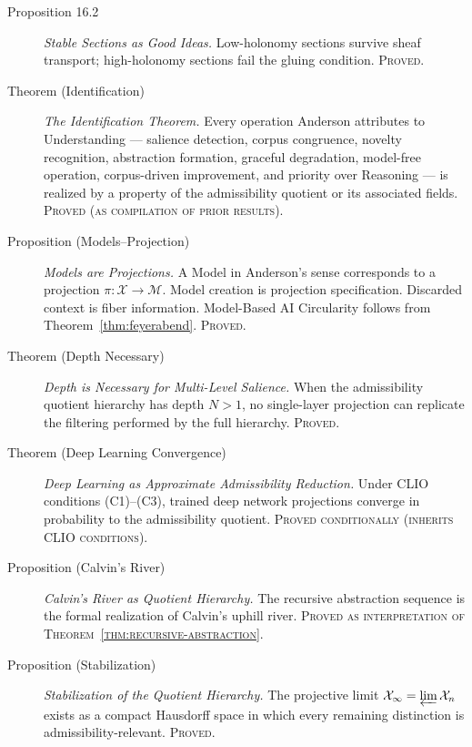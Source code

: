 \documentclass[12pt, a4paper, oneside]{book}
\newcommand{\X}{\mathcal{X}}
\newcommand{\M}{\mathcal{M}}
\newcommand{\proj}{\pi}
\begin{document}
\begin{description}
\item[Proposition 16.2] \textit{Stable Sections as Good Ideas.}
  Low-holonomy sections survive sheaf transport; high-holonomy sections
  fail the gluing condition. \textsc{Proved.}

\item[Theorem (Identification)] \textit{The Identification Theorem.}
  Every operation Anderson attributes to Understanding --- salience
  detection, corpus congruence, novelty recognition, abstraction
  formation, graceful degradation, model-free operation, corpus-driven
  improvement, and priority over Reasoning --- is realized by a property
  of the admissibility quotient or its associated fields.
  \textsc{Proved (as compilation of prior results).}

\item[Proposition (Models--Projection)] \textit{Models are Projections.}
  A Model in Anderson's sense corresponds to a projection $\proj : \X \to \M$.
  Model creation is projection specification. Discarded context is fiber
  information. Model-Based AI Circularity follows from
  Theorem~\ref{thm:feyerabend}. \textsc{Proved.}

\item[Theorem (Depth Necessary)] \textit{Depth is Necessary for Multi-Level Salience.}
  When the admissibility quotient hierarchy has depth $N > 1$, no
  single-layer projection can replicate the filtering performed by the
  full hierarchy. \textsc{Proved.}

\item[Theorem (Deep Learning Convergence)] \textit{Deep Learning as
  Approximate Admissibility Reduction.}
  Under CLIO conditions (C1)--(C3), trained deep network projections
  converge in probability to the admissibility quotient.
  \textsc{Proved conditionally (inherits CLIO conditions).}

\item[Proposition (Calvin's River)] \textit{Calvin's River as Quotient Hierarchy.}
  The recursive abstraction sequence is the formal realization of
  Calvin's uphill river. \textsc{Proved as interpretation of
  Theorem~\ref{thm:recursive-abstraction}.}

\item[Proposition (Stabilization)] \textit{Stabilization of the Quotient Hierarchy.}
  The projective limit $\X_\infty = \varprojlim \X_n$ exists as a
  compact Hausdorff space in which every remaining distinction is
  admissibility-relevant. \textsc{Proved.}


\end{description}
\end{document}
